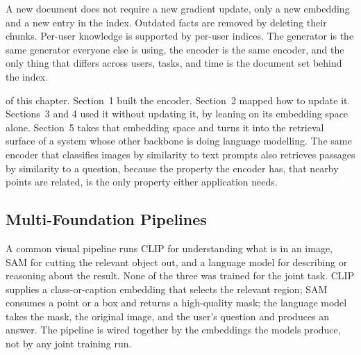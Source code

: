  A new document does not require a new gradient update, only a new embedding and a new entry in the index. Outdated facts are removed by deleting their chunks. Per-user knowledge is supported by per-user indices. The generator is the same generator everyone else is using, the encoder is the same encoder, and the only thing that differs across users, tasks, and time is the document set behind the index.

 of this chapter. Section~1 built the encoder. Section~2 mapped how to update it. Sections~3 and 4 used it without updating it, by leaning on its embedding space alone. Section~5 takes that embedding space and turns it into the retrieval surface of a system whose other backbone is doing language modelling. The same encoder that classifies images by similarity to text prompts also retrieves passages by similarity to a question, because the property the encoder has, that nearby points are related, is the only property either application needs.

\subsection{Multi-Foundation Pipelines}


 A common visual pipeline runs CLIP for understanding what is in an image, SAM\cite{Kirillov2023SAM} for cutting the relevant object out, and a language model for describing or reasoning about the result. None of the three was trained for the joint task. CLIP supplies a class-or-caption embedding that selects the relevant region; SAM consumes a point or a box and returns a high-quality mask; the language model takes the mask, the original image, and the user's question and produces an answer. The pipeline is wired together by the embeddings the models produce, not by any joint training run.

